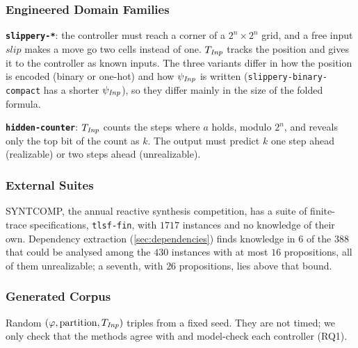 \subsubsection{Engineered Domain Families}

\textbf{\texttt{slippery-*}}: the controller must reach a corner of a $2^n \times 2^n$ grid, and a free input $\mathit{slip}$ makes a move go two cells instead of one.
$T_{\mathit{Inp}}$ tracks the position and gives it to the controller as known inputs.
The three variants differ in how the position is encoded (binary or one-hot) and how $\psi_{\mathit{Inp}}$ is written (\texttt{slippery-binary-compact} has a shorter $\psi_{\mathit{Inp}}$), so they differ mainly in the size of the folded formula.

\textbf{\texttt{hidden-counter}}: $T_{\mathit{Inp}}$ counts the steps where $a$ holds, modulo $2^n$, and reveals only the top bit of the count as $k$.
The output must predict $k$ one step ahead (realizable) or two steps ahead (unrealizable).

\subsubsection{External Suites}

SYNTCOMP, the annual reactive synthesis competition, has a suite of finite-trace specifications, \texttt{tlsf-fin}, with $1717$ instances and no knowledge of their own.
Dependency extraction (\cref{sec:dependencies}) finds knowledge in $6$ of the $388$ that could be analysed among the $430$ instances with at most $16$ propositions, all of them unrealizable; a seventh, with $26$ propositions, lies above that bound.

\subsubsection{Generated Corpus}

Random $(\varphi, \text{partition}, T_{\mathit{Inp}})$ triples from a fixed seed.
They are not timed; we only check that the methods agree with  and model-check each controller (RQ1).

